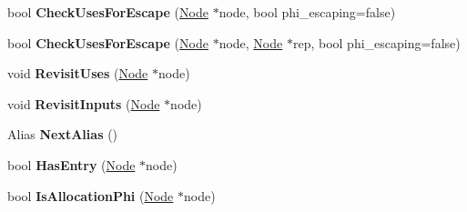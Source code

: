 \begin{DoxyCompactItemize}
\item 
bool {\bfseries Check\+Uses\+For\+Escape} (\hyperlink{classv8_1_1internal_1_1compiler_1_1_node}{Node} $\ast$node, bool phi\+\_\+escaping=false)\hypertarget{classv8_1_1internal_1_1compiler_1_1_escape_status_analysis_af6878f0c8cda00b7b5f2938a6a10342c}{}\label{classv8_1_1internal_1_1compiler_1_1_escape_status_analysis_af6878f0c8cda00b7b5f2938a6a10342c}

\item 
bool {\bfseries Check\+Uses\+For\+Escape} (\hyperlink{classv8_1_1internal_1_1compiler_1_1_node}{Node} $\ast$node, \hyperlink{classv8_1_1internal_1_1compiler_1_1_node}{Node} $\ast$rep, bool phi\+\_\+escaping=false)\hypertarget{classv8_1_1internal_1_1compiler_1_1_escape_status_analysis_a35ec4452104891bed9656945fb9cd83a}{}\label{classv8_1_1internal_1_1compiler_1_1_escape_status_analysis_a35ec4452104891bed9656945fb9cd83a}

\item 
void {\bfseries Revisit\+Uses} (\hyperlink{classv8_1_1internal_1_1compiler_1_1_node}{Node} $\ast$node)\hypertarget{classv8_1_1internal_1_1compiler_1_1_escape_status_analysis_a77264fbaadea35369cfae915c6e37201}{}\label{classv8_1_1internal_1_1compiler_1_1_escape_status_analysis_a77264fbaadea35369cfae915c6e37201}

\item 
void {\bfseries Revisit\+Inputs} (\hyperlink{classv8_1_1internal_1_1compiler_1_1_node}{Node} $\ast$node)\hypertarget{classv8_1_1internal_1_1compiler_1_1_escape_status_analysis_ae0f3c8e721a2e3229bbbc7db8304d2ef}{}\label{classv8_1_1internal_1_1compiler_1_1_escape_status_analysis_ae0f3c8e721a2e3229bbbc7db8304d2ef}

\item 
Alias {\bfseries Next\+Alias} ()\hypertarget{classv8_1_1internal_1_1compiler_1_1_escape_status_analysis_a1e734e131c976e560ab7423955b6f988}{}\label{classv8_1_1internal_1_1compiler_1_1_escape_status_analysis_a1e734e131c976e560ab7423955b6f988}

\item 
bool {\bfseries Has\+Entry} (\hyperlink{classv8_1_1internal_1_1compiler_1_1_node}{Node} $\ast$node)\hypertarget{classv8_1_1internal_1_1compiler_1_1_escape_status_analysis_ad9cdb85ccca17ba7e04242baffa78b3c}{}\label{classv8_1_1internal_1_1compiler_1_1_escape_status_analysis_ad9cdb85ccca17ba7e04242baffa78b3c}

\item 
bool {\bfseries Is\+Allocation\+Phi} (\hyperlink{classv8_1_1internal_1_1compiler_1_1_node}{Node} $\ast$node)\hypertarget{classv8_1_1internal_1_1compiler_1_1_escape_status_analysis_a6d8257f31e2c4756015584056134d05f}{}\label{classv8_1_1internal_1_1compiler_1_1_escape_status_analysis_a6d8257f31e2c4756015584056134d05f}


\end{DoxyCompactItemize}

